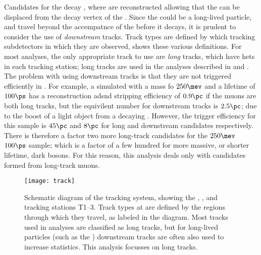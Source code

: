 Candidates for the decay \btokstrdb, where \dbtomumu are reconstructed allowing that the \db can
be displaced from the decay vertex of the \Bd.
Since the \db could be a long-lived particle, and travel beyond the accempatnce of the \velo before
it decays, it is prudent to consider the use of \emph{downstream} tracks.
Track types are defined by which tracking subdetectors in which they are observed,
 shows these various definitions.
For most \lhcb analyses, the only appropriate track to use are \emph{long} tracks, which have hets
in each tracking station; long tracks are used in the analyses described in  and
.
The problem with using downstream tracks is that they are not triggered efficiently in \hlttwo.
For example, a simulated \db with a mass fo $250\mev$ and a lifetime of $100\ps$ has a
reconstruction adsnd
stripping efficiency of \approx$0.9\pc$ if the muons are both long tracks, but the equivilent
number for downstream tracks is \approx$2.5\pc$; due to the boost of a light object from a decaying
\Bd.
However, the trigger efficiency for this sample is \approx$45\pc$ and $8\pc$ for long and
downstream candidates respectively.
There is therefore a factor two more long-track candidates for the $250\mev$ $100\ps$ sample; which
is a factor of a few hundred for more massive, or shorter lifetime, dark bosons.
For this reason, this analysis deals only with \db candidates formed from long-track muons.

\begin{figure}
  \begin{center}
    \texttt{[image: track]}
    \caption[Track definitions in the LHCb detector]{
      Schematic diagram of the \lhcb tracking system, showing the \velo, \ttracker, and tracking
      stations T1--3.
      Track types at \lhcb are defined by the regions through which they travel, as labeled in the
      diagram.
      Most tracks used in analyses are classified as long tracks, but for long-lived particles
      (such as the \KS) downstream tracks are often also used to increase statistics.
      This analysis focusses on long tracks.
    }
    \label{fig:db:lldd}
  \end{center}
\end{figure}



